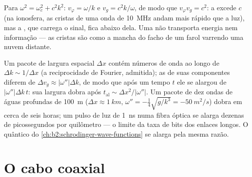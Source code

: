 \begin{example}\label{ex:b2:dispersion-wave-packets:superluminal}
Para $\omega^2 = \omega_c^2 + c^2k^2$: $v_\varphi = \omega/k$ e $v_g = c^2k/\omega$, de modo que
$v_\varphi v_g = c^2$: a  excede $c$ (na ionosfera, as cristas de uma
onda de \qty{10}{MHz} andam mais rápido que a luz), mas a , que carrega o sinal, fica abaixo dela. Uma 
não transporta energia nem informação --- as cristas são como a
mancha do facho de um farol varrendo uma nuvem distante.
\end{example}

\begin{remark}[Alargamento]\label{rem:b2:dispersion-wave-packets:spreading}
Um pacote de largura espacial $\Delta x$ contém números de onda ao longo de $\Delta k \sim
1/\Delta x$ (a reciprocidade de Fourier, admitida); as  de suas
componentes diferem de $\Delta v_g \approx |\omega''|\Delta k$, de modo que após um tempo $t$ ele
se alargou de $|\omega''|\Delta k\,t$: sua largura dobra após $t_{\text{al}}
\sim \Delta x^2/|\omega''|$. Um pacote de dez ondas de águas profundas de \qty{100}{m}
($\Delta x \approx \qty{1}{km}$, $\omega'' = -\tfrac14\sqrt{g/k^3} = \qty{-50}{m^2/s}$)
dobra em cerca de seis horas; um pulso de luz de \qty{1}{ns} numa
fibra óptica se alarga dezenas de picossegundos por quilômetro --- o
limite da taxa de bits dos enlaces longos. O  quântico do
\cref{ch:b2:schrodinger-wave-functions} se alarga pela mesma razão.
\end{remark}

\section{O cabo coaxial}

